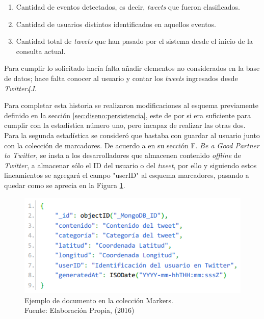 \begin{enumerate}
\item Cantidad de eventos detectados, es decir, \textit{tweets} que fueron clasificados.
\item Cantidad de usuarios distintos identificados en aquellos eventos.
\item Cantidad total de \textit{tweets} que han pasado por el sistema desde el inicio de la consulta actual.
\end{enumerate}

Para cumplir lo solicitado hacía falta añadir elementos no considerados en la base de datos; hace falta conocer al usuario y contar los \textit{tweets} ingresados desde \textit{Twitter4J}.

Para completar esta historia se realizaron modificaciones al esquema previamente definido en la sección \ref{sec:diseno:persistencia}, este de por si era suficiente para cumplir con la estadística número uno, pero incapaz de realizar las otras dos. Para la segunda estadística se consideró que bastaba con guardar al usuario junto con la colección de marcadores. De acuerdo a \cite{TwitterAgreement} en su sección F. \textit{Be a Good Partner to Twitter}, se insta a los desarrolladores que almacenen contenido \textit{offline} de \textit{Twitter}, a almacenar sólo el ID del usuario o del \textit{tweet}, por ello y siguiendo estos lineamientos se agregará el campo "userID" al esquema marcadores, pasando a quedar como se aprecia en la Figura \ref{fig:esquemaMarker2}.

\begin{figure}[H]
	\centering
	\captionsetup{justification=centering}
	\includegraphics[scale=0.8]{images/Marker2.png}
	\caption[Ejemplo de documento en la colección Markers.]{Ejemplo de documento en la colección Markers.\\Fuente: Elaboración Propia, (2016)}
	\label{fig:esquemaMarker2}
\end{figure}

